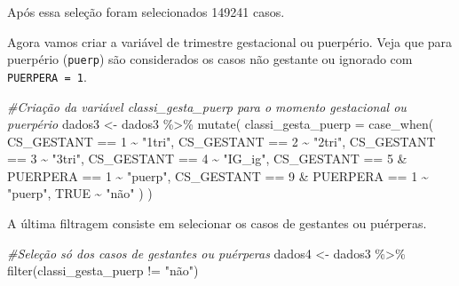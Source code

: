 \documentclass[
]{article}
\newenvironment{Shaded}{\begin{snugshade}}{\end{snugshade}}
\newcommand{\AttributeTok}[1]{\textcolor[rgb]{0.77,0.63,0.00}{#1}}
\newcommand{\CommentTok}[1]{\textcolor[rgb]{0.56,0.35,0.01}{\textit{#1}}}
\newcommand{\ConstantTok}[1]{\textcolor[rgb]{0.00,0.00,0.00}{#1}}
\newcommand{\DecValTok}[1]{\textcolor[rgb]{0.00,0.00,0.81}{#1}}
\newcommand{\FunctionTok}[1]{\textcolor[rgb]{0.00,0.00,0.00}{#1}}
\newcommand{\NormalTok}[1]{#1}
\newcommand{\OtherTok}[1]{\textcolor[rgb]{0.56,0.35,0.01}{#1}}
\newcommand{\SpecialCharTok}[1]{\textcolor[rgb]{0.00,0.00,0.00}{#1}}
\newcommand{\StringTok}[1]{\textcolor[rgb]{0.31,0.60,0.02}{#1}}
\begin{document}
Após essa seleção foram selecionados 149241 casos.

Agora vamos criar a variável de trimestre gestacional ou puerpério. Veja
que para puerpério (\texttt{puerp}) são considerados os casos não
gestante ou ignorado com \texttt{PUERPERA\ =\ 1}.

\begin{Shaded}
\begin{Highlighting}[]
\CommentTok{\#Criação da variável classi\_gesta\_puerp para o momento gestacional ou puerpério}
\NormalTok{dados3 }\OtherTok{\textless{}{-}}\NormalTok{ dados3 }\SpecialCharTok{\%\textgreater{}\%}
  \FunctionTok{mutate}\NormalTok{(}
    \AttributeTok{classi\_gesta\_puerp =} \FunctionTok{case\_when}\NormalTok{(}
\NormalTok{      CS\_GESTANT }\SpecialCharTok{==} \DecValTok{1}  \SpecialCharTok{\textasciitilde{}} \StringTok{"1tri"}\NormalTok{,}
\NormalTok{      CS\_GESTANT }\SpecialCharTok{==} \DecValTok{2}  \SpecialCharTok{\textasciitilde{}} \StringTok{"2tri"}\NormalTok{,}
\NormalTok{      CS\_GESTANT }\SpecialCharTok{==} \DecValTok{3}  \SpecialCharTok{\textasciitilde{}} \StringTok{"3tri"}\NormalTok{,}
\NormalTok{      CS\_GESTANT }\SpecialCharTok{==} \DecValTok{4}  \SpecialCharTok{\textasciitilde{}} \StringTok{"IG\_ig"}\NormalTok{,}
\NormalTok{      CS\_GESTANT }\SpecialCharTok{==} \DecValTok{5} \SpecialCharTok{\&}
\NormalTok{        PUERPERA }\SpecialCharTok{==} \DecValTok{1} \SpecialCharTok{\textasciitilde{}} \StringTok{"puerp"}\NormalTok{,}
\NormalTok{      CS\_GESTANT }\SpecialCharTok{==} \DecValTok{9} \SpecialCharTok{\&}\NormalTok{ PUERPERA }\SpecialCharTok{==} \DecValTok{1} \SpecialCharTok{\textasciitilde{}} \StringTok{"puerp"}\NormalTok{,}
      \ConstantTok{TRUE} \SpecialCharTok{\textasciitilde{}} \StringTok{"não"}
\NormalTok{    )}
\NormalTok{  )}
\end{Highlighting}
\end{Shaded}

A última filtragem consiste em selecionar os casos de gestantes ou
puérperas.

\begin{Shaded}
\begin{Highlighting}[]
\CommentTok{\#Seleção só dos casos de gestantes ou puérperas}
\NormalTok{dados4 }\OtherTok{\textless{}{-}}\NormalTok{ dados3 }\SpecialCharTok{\%\textgreater{}\%}
  \FunctionTok{filter}\NormalTok{(classi\_gesta\_puerp }\SpecialCharTok{!=} \StringTok{"não"}\NormalTok{)}
\end{Highlighting}
\end{Shaded}
\end{document}
